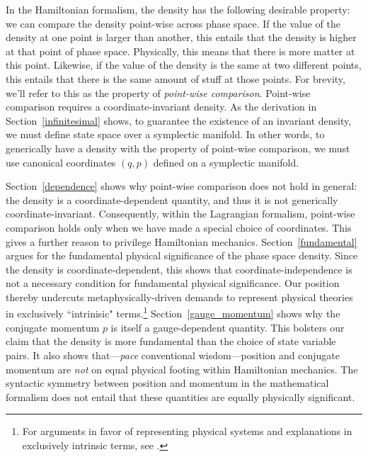 \documentclass[letterpaper]{article}
\begin{document}
In the Hamiltonian formalism, the density has the following desirable property: we can compare the density point-wise across phase space. If the value of the density at one point is larger than another, this entails that the density is higher at that point of phase space. Physically, this means that there is more matter at this point. Likewise, if the value of the density is the same at two different points, this entails that there is the same amount of stuff at those points. For brevity, we'll refer to this as the property of \textit{point-wise comparison}. Point-wise comparison requires a coordinate-invariant density. As the derivation in Section~\ref{infinitesimal} shows, to guarantee the existence of an invariant density, we must define state space over a symplectic manifold. In other words, to generically have a density with the property of point-wise comparison, we must use canonical coordinates $(q, p)$ defined on a symplectic manifold. 

Section~\ref{dependence} shows why point-wise comparison does not hold in general: the density is a coordinate-dependent quantity, and thus it is not generically coordinate-invariant. Consequently, within the Lagrangian formalism, point-wise comparison holds only when we have made a special choice of coordinates. This gives a further reason to privilege Hamiltonian mechanics. Section~\ref{fundamental} argues for the fundamental physical significance of the phase space density. Since the density is coordinate-dependent, this shows that coordinate-independence is not a necessary condition for fundamental physical significance. Our position thereby undercuts metaphysically-driven demands to represent physical theories in exclusively ``intrinisic" terms.\footnote{For arguments in favor of representing physical systems and explanations in exclusively intrinsic terms, see \textcites[]{Field,North,Chen2018}.} Section~\ref{gauge_momentum} shows why the conjugate momentum $p$ is itself a gauge-dependent quantity. This bolsters our claim that the density is more fundamental than the choice of state variable pairs. It also shows that---\textit{pace} conventional wisdom---position and conjugate momentum are \textit{not} on equal physical footing within Hamiltonian mechanics. The syntactic symmetry between position and momentum in the mathematical formalism does not entail that these quantities are equally physically significant. 
\end{document}
